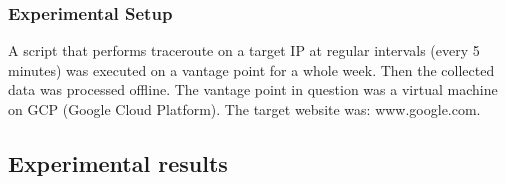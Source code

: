 \documentclass[a4paper,10pt]{article}
\begin{document}
\maketitle
\subsubsection{Experimental Setup}

A script that performs traceroute on a target IP at regular intervals (every 5 minutes) was executed on a vantage point for a whole week. Then the collected data was processed offline. The vantage point in question was a virtual machine on GCP (Google Cloud Platform). The target website was: www.google.com.

\subsection{Experimental results}
\end{document}
